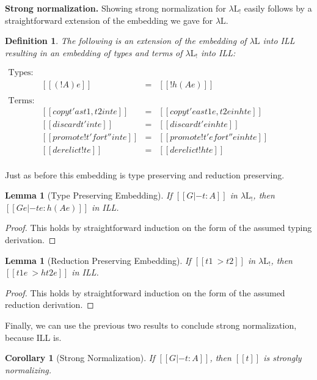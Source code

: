 \documentclass{article}
\newtheorem{lemma}[theorem]{Lemma}
\newtheorem{corollary}[theorem]{Corollary}
\newtheorem{definition}[theorem]{Definition}
\begin{document}
\textbf{Strong normalization.} Showing strong normalization for
$\lambda\text{L}_!$ easily follows by a straightforward extension of
the embedding we gave for $\lambda\text{L}$.
\begin{definition}
  \label{def:embed-lambda-L!-in-ILL}
  The following is an extension of the embedding of $\lambda\text{L}$
  into ILL resulting in an embedding of types and terms of
  $\lambda\text{L}_!$ into ILL:
  \begin{center}
    \begin{math}
      \begin{array}{lrllllllllllllllllll}
        \text{Types:}\\
        & [[(! A) e]] & = & [[! h(A e)]]\\        
        \\
        \text{Terms:}\\
        & [[{copy t' as t1 , t2 in t} e]] & = & [[copy t' e as t1 e , t2 e in h{t e}]]\\
        & [[{discard t' in t} e]] & = & [[discard t' e in h{t e}]]\\
        & [[{promote! t' for t'' in t} e]] & = & [[promote! t' e for t'' e in h{t e}]]\\
        & [[{derelict! t} e]] & = & [[derelict! h{t e}]]\\
      \end{array}
    \end{math}
  \end{center}
\end{definition}

\noindent
Just as before this embedding is type preserving and reduction preserving.
\begin{lemma}[Type Preserving Embedding]
  \label{lemma:type_preserving_embedding_lambdaL!}
  If $[[G |- t : A]]$ in $\lambda\text{L}_!$, then
  $[[G e |- t e : h(A e)]]$ in ILL.
\end{lemma}
\begin{proof}
  This holds by straightforward induction on the form of the assumed
  typing derivation.
\end{proof}

\begin{lemma}[Reduction Preserving Embedding]
  \label{lemma:reduction_preserving_embedding_lambdaL!}
  If $[[t1 ~> t2]]$ in $\lambda\text{L}_!$, then $[[t1 e ~> h{t2 e}]]$
  in ILL.
\end{lemma}
\begin{proof}
  This holds by straightforward induction on the form of the assumed
  reduction derivation.
\end{proof}
\noindent
Finally, we can use the previous two results to conclude strong
normalization, because ILL is.
\begin{corollary}[Strong Normalization]
  \label{corollary:strong_normalization_lambdaL!}
  If $[[G |- t : A]]$, then $[[t]]$ is strongly normalizing.
\end{corollary}
\end{document}
